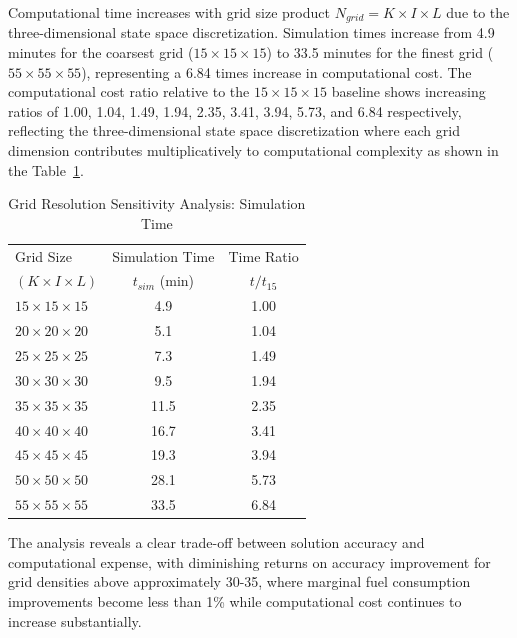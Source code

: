 Computational time increases with grid size product $N_{grid} = K \times I \times L$ due to the three-dimensional state space discretization. Simulation times increase from 4.9 minutes for the coarsest grid ($15 \times 15 \times 15$) to 33.5 minutes for the finest grid ($55 \times 55 \times 55$), representing a 6.84 times increase in computational cost. The computational cost ratio relative to the $15 \times 15 \times 15$ baseline shows increasing ratios of 1.00, 1.04, 1.49, 1.94, 2.35, 3.41, 3.94, 5.73, and 6.84 respectively, reflecting the three-dimensional state space discretization where each grid dimension contributes multiplicatively to computational complexity as shown in the Table~\ref{tab:GridResolutionSensitivityAnalysis:SimulationTime}.

\begin{table}[h]
    \centering
    \footnotesize
    \begin{tabular}{l c c}
        \hline
        Grid Size & Simulation Time & Time Ratio \\
        $(K \times I \times L)$ & $t_{sim}$ (min) & $t/t_{15}$ \\
        \hline
        $15 \times 15 \times 15$ & 4.9 & 1.00 \\
        $20 \times 20 \times 20$ & 5.1 & 1.04 \\
        $25 \times 25 \times 25$ & 7.3 & 1.49 \\
        $30 \times 30 \times 30$ & 9.5 & 1.94 \\
        $35 \times 35 \times 35$ & 11.5 & 2.35 \\
        $40 \times 40 \times 40$ & 16.7 & 3.41 \\
        $45 \times 45 \times 45$ & 19.3 & 3.94 \\
        $50 \times 50 \times 50$ & 28.1 & 5.73 \\
        $55 \times 55 \times 55$ & 33.5 & 6.84 \\
        \hline
    \end{tabular}
    \caption{Grid Resolution Sensitivity Analysis: Simulation Time}
    \label{tab:GridResolutionSensitivityAnalysis:SimulationTime}
\end{table}


The analysis reveals a clear trade-off between solution accuracy and computational expense, with diminishing returns on accuracy improvement for grid densities above approximately 30-35, where marginal fuel consumption improvements become less than 1\% while computational cost continues to increase substantially.  


